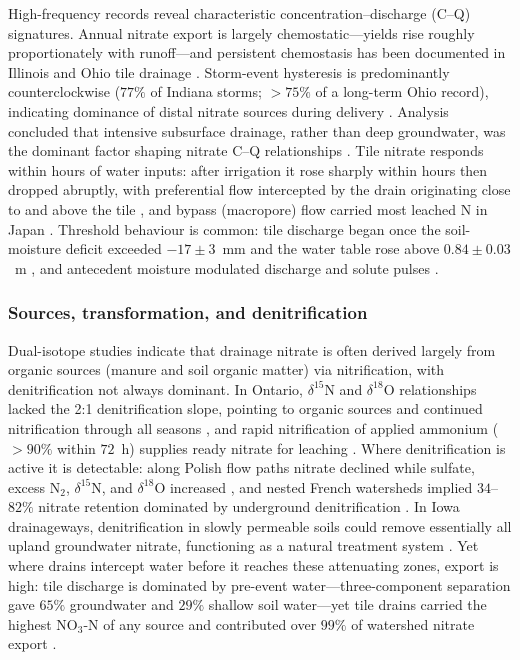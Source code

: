 \documentclass[11pt]{article}
\begin{document}
High-frequency records reveal characteristic concentration--discharge (C--Q)
signatures. Annual nitrate export is largely chemostatic---yields rise
roughly proportionately with runoff---and persistent chemostasis has been
documented in Illinois and Ohio tile drainage
\parencite{Speir2021,Hu2024,Williams2015}. Storm-event hysteresis is
predominantly counterclockwise ($77\%$ of Indiana storms; $>75\%$ of a
long-term Ohio record), indicating dominance of distal nitrate sources during
delivery \parencite{Speir2021,Liu2022b}. Analysis concluded that intensive
subsurface drainage, rather than deep groundwater, was the dominant factor
shaping nitrate C--Q relationships \parencite{Liu2022b}. Tile nitrate responds
within hours of water inputs: after irrigation it rose sharply within hours
then dropped abruptly, with preferential flow intercepted by the drain
originating close to and above the tile \parencite{Mohanty1998}, and bypass
(macropore) flow carried most leached N in Japan \parencite{Hayashi1999}.
Threshold behaviour is common: tile discharge began once the soil-moisture
deficit exceeded $-17\pm3$~mm and the water table rose above $0.84\pm0.03$~m
\parencite{Williams2022}, and antecedent moisture modulated discharge and
solute pulses \parencite{Trentman2020,Kennedy2012}.

\subsubsection{Sources, transformation, and denitrification}

Dual-isotope studies indicate that drainage nitrate is often derived largely
from organic sources (manure and soil organic matter) via nitrification, with
denitrification not always dominant. In Ontario, $\delta^{15}$N and
$\delta^{18}$O relationships lacked the 2:1 denitrification slope, pointing to
organic sources and continued nitrification through all seasons
\parencite{Smith2011,Smith2011b}, and rapid nitrification of applied ammonium
($>90\%$ within $72$~h) supplies ready nitrate for leaching \parencite{Hu2024}.
Where denitrification is active it is detectable: along Polish flow paths
nitrate declined while sulfate, excess N$_2$, $\delta^{15}$N, and
$\delta^{18}$O increased \parencite{Dragon2016}, and nested French watersheds
implied $34$--$82\%$ nitrate retention dominated by underground denitrification
\parencite{Billy2011,Billy2013}. In Iowa drainageways, denitrification in
slowly permeable soils could remove essentially all upland groundwater nitrate,
functioning as a natural treatment system
\parencite{Schilling2007,Cambardella1999}. Yet where drains intercept water
before it reaches these attenuating zones, export is high: tile discharge is
dominated by pre-event water---three-component separation gave $65\%$
groundwater and $29\%$ shallow soil water---yet tile drains carried the highest
NO$_3$-N of any source and contributed over $99\%$ of watershed nitrate export
\parencite{Williams2022,Grose2022}.

\printbibliography
\end{document}
